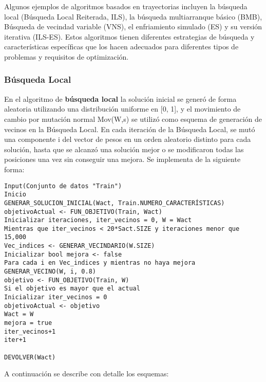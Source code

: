 Algunos ejemplos de algoritmos basados en trayectorias incluyen la búsqueda local (Búsqueda Local Reiterada, ILS), la búsqueda multiarranque básico (BMB), Búsqueda de vecindad variable (VNS),  el enfriamiento simulado (ES) y su versión iterativa (ILS-ES). Estos algoritmos tienen diferentes estrategias de búsqueda y características específicas que los hacen adecuados para diferentes tipos de problemas y requisitos de optimización.

\subsubsection{Búsqueda Local}
En el algoritmo de \textbf{búsqueda local} la solución inicial se generó de forma aleatoria utilizando una distribución uniforme en [0, 1], y el movimiento de cambio por mutación normal Mov(W,s) se utilizó como esquema de generación de vecinos en la Búsqueda Local. En cada iteración de la Búsqueda Local, se mutó una componente i del vector de pesos en un orden aleatorio distinto para cada solución, hasta que se alcanzó una solución mejor o se modificaron todas las posiciones una vez sin conseguir una mejora. Se implementa de la siguiente forma:
\begin{verbatim}
Input(Conjunto de datos "Train")
Inicio
GENERAR_SOLUCION_INICIAL(Wact, Train.NUMERO_CARACTERÍSTICAS)
objetivoActual <- FUN_OBJETIVO(Train, Wact)
Inicializar iteraciones, iter_vecinos = 0, W = Wact
Mientras que iter_vecinos < 20*Sact.SIZE y iteraciones menor que 15,000
Vec_indices <- GENERAR_VECINDARIO(W.SIZE)
Inicializar bool mejora <- false
Para cada i en Vec_indices y mientras no haya mejora
GENERAR_VECINO(W, i, 0.8)
objetivo <- FUN_OBJETIVO(Train, W)
Si el objetivo es mayor que el actual
Inicializar iter_vecinos = 0
objetivoActual <- objetivo
Wact = W
mejora = true
iter_vecinos+1
iter+1

DEVOLVER(Wact)
\end{verbatim}
A continuación se describe con detalle los esquemas:
